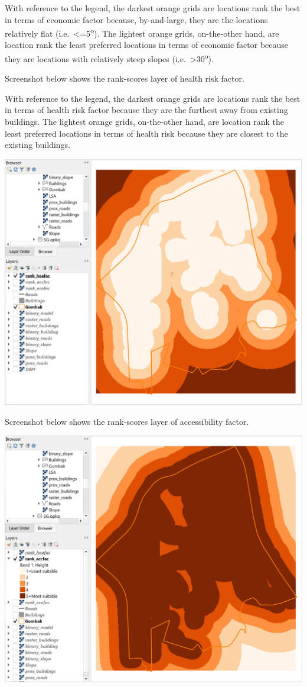 \documentclass[
  letterpaper,
  DIV=11,
  numbers=noendperiod]{scrreprt}
\begin{document}
With reference to the legend, the darkest orange grids are locations
rank the best in terms of economic factor because, by-and-large, they
are the locations relatively flat (i.e.~\textless=5\textsuperscript{o}).
The lightest orange grids, on-the-other hand, are location rank the
least preferred locations in terms of economic factor because they are
locations with relatively steep slopes
(i.e.~\textgreater30\textsuperscript{o}).

Screenshot below shows the rank-scores layer of health risk factor.

With reference to the legend, the darkest orange grids are locations
rank the best in terms of health risk factor because they are the
furthest away from existing buildings. The lightest orange grids,
on-the-other hand, are location rank the least preferred locations in
terms of health risk because they are closest to the existing buildings.

\includegraphics{./img08/image7.jpg}

Screenshot below shows the rank-scores layer of accessibility factor.

\includegraphics{./img08/image8.jpg}
\end{document}
